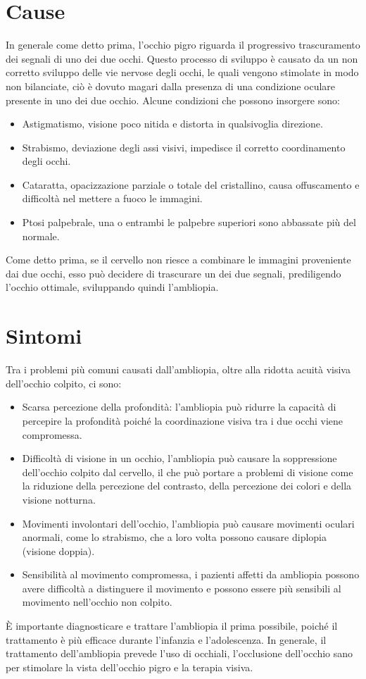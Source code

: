 \documentclass[
a4paper,
cleardoublepage=empty,
headings=twolinechapter,
numbers=autoenddot,
]{scrbook}
\begin{document}
	\section{Cause}
	In generale come detto prima, l'occhio pigro riguarda il progressivo trascuramento dei segnali di uno dei due occhi.
	Questo processo di sviluppo è causato da un non corretto sviluppo delle vie nervose degli occhi, le quali vengono stimolate in modo non bilanciate, ciò è dovuto magari dalla presenza di una condizione oculare presente in uno dei due occhio.
	Alcune condizioni che possono insorgere sono:
	\begin{itemize}
		\item Astigmatismo, visione poco nitida e distorta in qualsivoglia direzione.
		\item Strabismo, deviazione degli assi visivi, impedisce il corretto coordinamento degli occhi. 
		\item Cataratta, opacizzazione parziale o totale del cristallino,  causa offuscamento e difficoltà nel mettere a fuoco le immagini.
		\item Ptosi palpebrale, una o entrambi le palpebre superiori sono abbassate più del normale.
	\end{itemize}
	Come detto prima, se il cervello non riesce a combinare le immagini proveniente dai due occhi, esso può decidere di trascurare un dei due segnali, prediligendo l'occhio ottimale, sviluppando quindi l'ambliopia.
	\section{Sintomi}
	Tra i problemi più comuni causati dall'ambliopia, oltre alla ridotta acuità visiva dell'occhio colpito, ci sono:
	
	\begin{itemize}
		\item Scarsa percezione della profondità: l'ambliopia può ridurre la capacità di percepire la profondità poiché la coordinazione visiva tra i due occhi viene compromessa.
		\item Difficoltà di visione in un occhio, l'ambliopia può causare la soppressione dell'occhio colpito dal cervello, il che può portare a problemi di visione come la riduzione della percezione del contrasto, della percezione dei colori e della visione notturna.
		\item Movimenti involontari dell'occhio, l'ambliopia può causare movimenti oculari anormali, come lo strabismo, che a loro volta possono causare diplopia (visione doppia).
		\item Sensibilità al movimento compromessa, i pazienti affetti da ambliopia possono avere difficoltà a distinguere il movimento e possono essere più sensibili al movimento nell'occhio non colpito.
	\end{itemize}
	È importante diagnosticare e trattare l'ambliopia il prima possibile, poiché il trattamento è più efficace durante l'infanzia e l'adolescenza. In generale, il trattamento dell'ambliopia prevede l'uso di occhiali, l'occlusione dell'occhio sano per stimolare la vista dell'occhio pigro e la terapia visiva.
\end{document}
